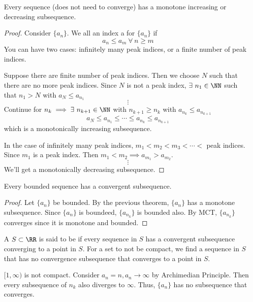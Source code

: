 \documentclass[12pt]{scrartcl}
\begin{document}
\begin{theorem}
  Every sequence (does not need to converge) has a monotone increasing or decreasing subsequence.
  \begin{proof}
    Consider $\{a_n\}$. We all an index a  for $\{a_n\}$ if 
    \[a_n \leq a_m \ \forall \ n \geq m\]
    You can have two cases: infinitely many peak indices, or a finite number of peak indices.

    Suppose there are finite number of peak indices. Then we choose $N$ such that there are no 
    more peak indices. Since $N$ is not a peak index, $\exists \ n_1 \in \NN$ such that 
    $n_1 > N$ with $a_N \leq a_{n_1}$
    \[\vdots\]
    Continue for $n_k \implies \exists \ n_{k+1} \in \NN$ with $n_{k+1} \geq n_k$ with $a_{n_k} \leq a_{n_{k+1}}$
    \[a_N \leq a_{n_1} \leq \cdots \leq a_{n_k} \leq a_{n_{k+1}}\]
    which is a monotonically increasing subsequence. 

    In the case of infinitely many peak indices, $m_1 < m_2 < m_3 < \cdots < $ peak indices. 
    Since $m_1$ is a peak index. Then $m_1 < m_2 \implies a_{m_1} > a_{m_2}$.
    \[\vdots\]
    We'll get a monotonically decreasing subsequence.
  \end{proof}
\end{theorem}

\begin{theorem}
  Every bounded sequence has a convergent subsequence.

  \begin{proof}
    Let $\{a_n\}$ be bounded. By the previous theorem, $\{a_n\}$ has a monotone subsequence. 
    Since $\{a_n\}$ is boundeed, $\{a_{n_k}\}$ is bounded also. By MCT, 
    $\{a_{n_k}\}$ converges since it is monotone and bounded.
  \end{proof}
\end{theorem}

\begin{definition}
  A $S \subset \RR$ is said to be  if every sequence 
  in $S$ has a convergent subsequence converging to a point in $S$. For a set to not be compact, 
  we find a sequence in $S$ that has no convergence subsequence that converges to a point in $S$. 
\end{definition}

\begin{example}
  $[1, \infty)$ is not compact. Consider $a_n = n, a_n \to\infty$ by Archimedian Principle. 
  Then every subsequence of $n_k$ also diverges to $\infty$. Thus, $\{a_n\}$ has no subsequence 
  that converges. 
\end{example}
\end{document}
